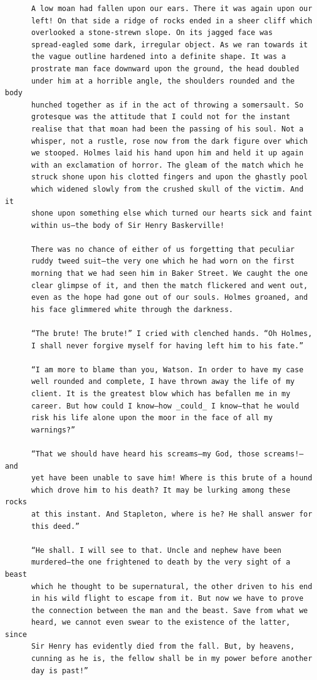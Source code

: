 \documentclass{article}
\begin{document}
\begin{verbatim}
      A low moan had fallen upon our ears. There it was again upon our
      left! On that side a ridge of rocks ended in a sheer cliff which
      overlooked a stone-strewn slope. On its jagged face was
      spread-eagled some dark, irregular object. As we ran towards it
      the vague outline hardened into a definite shape. It was a
      prostrate man face downward upon the ground, the head doubled
      under him at a horrible angle, the shoulders rounded and the body
      hunched together as if in the act of throwing a somersault. So
      grotesque was the attitude that I could not for the instant
      realise that that moan had been the passing of his soul. Not a
      whisper, not a rustle, rose now from the dark figure over which
      we stooped. Holmes laid his hand upon him and held it up again
      with an exclamation of horror. The gleam of the match which he
      struck shone upon his clotted fingers and upon the ghastly pool
      which widened slowly from the crushed skull of the victim. And it
      shone upon something else which turned our hearts sick and faint
      within us—the body of Sir Henry Baskerville!

      There was no chance of either of us forgetting that peculiar
      ruddy tweed suit—the very one which he had worn on the first
      morning that we had seen him in Baker Street. We caught the one
      clear glimpse of it, and then the match flickered and went out,
      even as the hope had gone out of our souls. Holmes groaned, and
      his face glimmered white through the darkness.

      “The brute! The brute!” I cried with clenched hands. “Oh Holmes,
      I shall never forgive myself for having left him to his fate.”

      “I am more to blame than you, Watson. In order to have my case
      well rounded and complete, I have thrown away the life of my
      client. It is the greatest blow which has befallen me in my
      career. But how could I know—how _could_ I know—that he would
      risk his life alone upon the moor in the face of all my
      warnings?”

      “That we should have heard his screams—my God, those screams!—and
      yet have been unable to save him! Where is this brute of a hound
      which drove him to his death? It may be lurking among these rocks
      at this instant. And Stapleton, where is he? He shall answer for
      this deed.”

      “He shall. I will see to that. Uncle and nephew have been
      murdered—the one frightened to death by the very sight of a beast
      which he thought to be supernatural, the other driven to his end
      in his wild flight to escape from it. But now we have to prove
      the connection between the man and the beast. Save from what we
      heard, we cannot even swear to the existence of the latter, since
      Sir Henry has evidently died from the fall. But, by heavens,
      cunning as he is, the fellow shall be in my power before another
      day is past!”


\end{verbatim}
\end{document}
